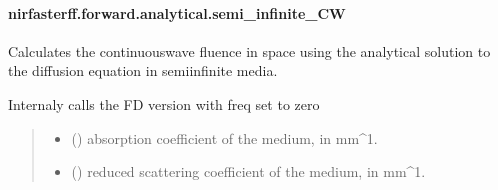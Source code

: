 \documentclass[letterpaper,10pt,english]{sphinxmanual}
\begin{document}
\sphinxstepscope


\paragraph{nirfasterff.forward.analytical.semi\_infinite\_CW}
\label{\detokenize{_autosummary/nirfasterff.forward.analytical.semi_infinite_CW:nirfasterff-forward-analytical-semi-infinite-cw}}\label{\detokenize{_autosummary/nirfasterff.forward.analytical.semi_infinite_CW::doc}}

\begin{fulllineitems}
\label{\detokenize{_autosummary/nirfasterff.forward.analytical.semi_infinite_CW:nirfasterff.forward.analytical.semi_infinite_CW}}
\pysigstartsignatures
\pysiglinewithargsret
{}
{\sphinxparamcomma {}\sphinxparamcomma {}\sphinxparamcomma {}\sphinxparamcomma {}\sphinxparamcomma {}\sphinxparamcomma {}}
{}
\pysigstopsignatures
\sphinxAtStartPar
Calculates the continuous\sphinxhyphen{}wave fluence in space using the analytical solution to the diffusion equation in semi\sphinxhyphen{}infinite media.

\sphinxAtStartPar
Internaly calls the FD version with freq set to zero
\begin{quote}\begin{description}
\begin{itemize}
\item {} 
\sphinxAtStartPar
{} () \textendash{} absorption coefficient of the medium, in mm\textasciicircum{}\sphinxhyphen{}1.

\item {} 
\sphinxAtStartPar
{} () \textendash{} reduced scattering coefficient of the medium, in mm\textasciicircum{}\sphinxhyphen{}1.


\end{itemize}
\end{description}
\end{quote}
\end{fulllineitems}
\end{document}
